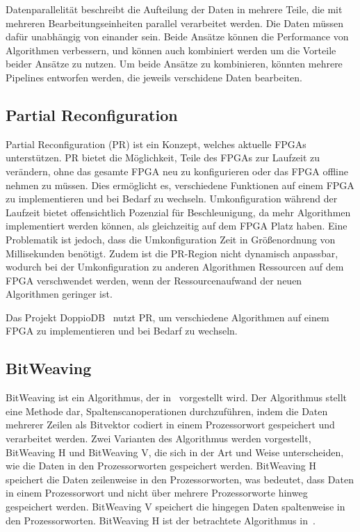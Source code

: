 \documentclass[conference]{IEEEtran}
\begin{document}
Datenparallelität beschreibt die Aufteilung der Daten in mehrere Teile, die mit mehreren Bearbeitungseinheiten parallel verarbeitet werden. Die Daten müssen dafür unabhängig von einander sein.
Beide Ansätze können die Performance von Algorithmen verbessern, und können auch kombiniert werden um die Vorteile beider Ansätze zu nutzen. Um beide Ansätze zu kombinieren, könnten mehrere Pipelines entworfen werden,
die jeweils verschidene Daten bearbeiten.



\subsection{Partial Reconfiguration}
Partial Reconfiguration (PR) ist ein Konzept, welches aktuelle FPGAs unterstützen. PR bietet die Möglichkeit, Teile des FPGAs zur Laufzeit zu verändern,
ohne das gesamte FPGA neu zu konfigurieren oder das FPGA offline nehmen zu müssen. Dies ermöglicht es, verschiedene Funktionen auf einem FPGA zu implementieren
und bei Bedarf zu wechseln. Umkonfiguration während der Laufzeit bietet offensichtlich Pozenzial für Beschleunigung, da mehr Algorithmen implementiert
werden können, als gleichzeitig auf dem FPGA Platz haben. Eine Problematik ist jedoch, dass die Umkonfiguration Zeit in Größenordnung von Millisekunden benötigt.
Zudem ist die PR-Region nicht dynamisch anpassbar, wodurch bei der Umkonfiguration zu anderen Algorithmen Ressourcen auf dem FPGA verschwendet werden, wenn der
Ressourcenaufwand der neuen Algorithmen geringer ist.

Das Projekt DoppioDB~\cite{istvan_glass_2019} nutzt PR, um verschiedene Algorithmen auf einem FPGA zu implementieren und bei Bedarf zu wechseln.




\subsection{BitWeaving}
BitWeaving ist ein Algorithmus, der in~\cite{li_bitweaving_2013} vorgestellt wird. Der Algorithmus stellt eine Methode dar, Spaltenscanoperationen durchzuführen, indem
die Daten mehrerer Zeilen als Bitvektor codiert in einem Prozessorwort gespeichert und verarbeitet werden. Zwei Varianten des Algorithmus werden vorgestellt, BitWeaving H und BitWeaving V,
die sich in der Art und Weise unterscheiden, wie die Daten in den Prozessorworten gespeichert werden. BitWeaving H speichert die Daten zeilenweise in den Prozessorworten, was bedeutet, dass
Daten in einem Prozessorwort und nicht über mehrere Prozessorworte hinweg gespeichert werden. BitWeaving V speichert die hingegen Daten spaltenweise in den Prozessorworten. BitWeaving H ist
der betrachtete Algorithmus in~\cite{lisa_column_2018}.
\end{document}
